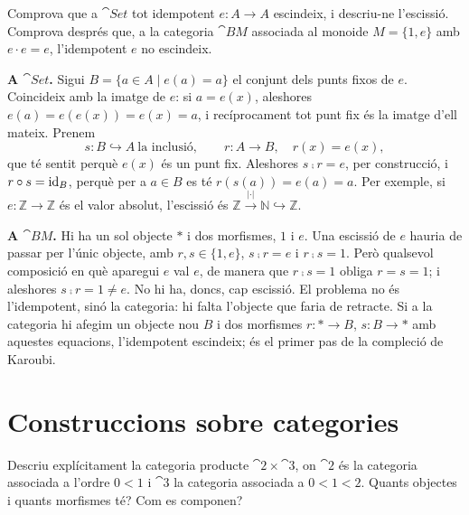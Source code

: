 \begin{exercici}\label{pr-idempotents}
Comprova que a $\cat{Set}$ tot idempotent $e\colon A\to A$ escindeix, i descriu-ne l'escissió. Comprova després que, a la categoria $\cat{B}M$ associada al monoide $M=\{1,e\}$ amb $e\cdot e=e$, l'idempotent $e$ no escindeix.
\end{exercici}

\begin{solucio}
\textbf{A $\cat{Set}$.} Sigui $B=\{a\in A\mid e(a)=a\}$ el conjunt dels punts fixos de $e$. Coincideix amb la imatge de $e$: si $a=e(x)$, aleshores $e(a)=e(e(x))=e(x)=a$, i recíprocament tot punt fix és la imatge d'ell mateix. Prenem
\[
s\colon B\hookrightarrow A\ \text{la inclusió},
\qquad
r\colon A\to B,\quad r(x)=e(x),
\]
que té sentit perquè $e(x)$ és un punt fix. Aleshores $s\comp r=e$, per construcció, i $r\circ s=\operatorname{id}_B$, perquè per a $a\in B$ es té $r(s(a))=e(a)=a$. Per exemple, si $e\colon\mathbb Z\to\mathbb Z$ és el valor absolut, l'escissió és $\mathbb Z\xrightarrow{\ \lvert\cdot\rvert\ }\mathbb N\hookrightarrow\mathbb Z$.

\textbf{A $\cat{B}M$.} Hi ha un sol objecte $\ast$ i dos morfismes, $1$ i $e$. Una escissió de $e$ hauria de passar per l'únic objecte, amb $r,s\in\{1,e\}$, $s\comp r=e$ i $r\comp s=1$. Però qualsevol composició en què aparegui $e$ val $e$, de manera que $r\comp s=1$ obliga $r=s=1$; i aleshores $s\comp r=1\neq e$. No hi ha, doncs, cap escissió. El problema no és l'idempotent, sinó la categoria: hi falta l'objecte que faria de retracte. Si a la categoria hi afegim un objecte nou $B$ i dos morfismes $r\colon\ast\to B$, $s\colon B\to\ast$ amb aquestes equacions, l'idempotent escindeix; és el primer pas de la compleció de Karoubi.
\end{solucio}

\section{Construccions sobre categories}

\begin{exercici}
Descriu explícitament la categoria producte $\cat{2}\times\cat{3}$, on $\cat{2}$ és la categoria associada a l'ordre $0<1$ i $\cat{3}$ la categoria associada a $0<1<2$. Quants objectes i quants morfismes té? Com es componen?
\end{exercici}

